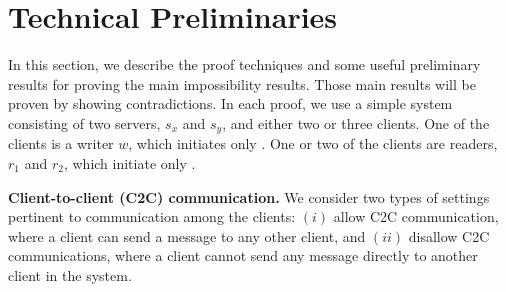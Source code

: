 \section{Technical Preliminaries}
\label{sec:summary}
In this section, we describe the proof techniques and some useful preliminary results for proving the main impossibility results.
Those main results will be proven by showing contradictions.
In each proof, we use a simple system consisting of two servers, $s_x$ and $s_y$, and either two or three clients.
One of the clients is a writer $w$, which initiates only \wots{}.
One or two of the clients are readers, $r_1$ and $r_2$, which initiate only \rots{}.

{ \color{blue} 
{\bf Client-to-client (C2C) communication.}
We consider two types of settings pertinent to communication among the clients: $(i)$ allow C2C communication, where a client can send a message to any other client, and $(ii)$ disallow C2C communications, where a client cannot send any message directly to another client in the system.
}


